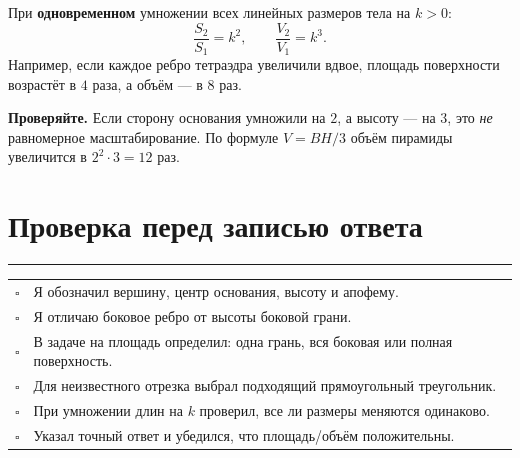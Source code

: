 \documentclass[a4paper,12pt]{article}
\newcommand{\sect}[1]{\section{#1}\vspace{-1.5mm}\noindent\color{accent}\rule{\linewidth}{0.45pt}\color{textgray}\vspace{2mm}}
\newcommand{\warning}[1]{\par\textcolor{darkaccent}{\textbf{Проверяйте.}} #1\par}
\newcommand{\cb}{\(\square\)}
\begin{document}
При \textbf{одновременном} умножении всех линейных размеров тела на \(k>0\):
\[
\boxed{\frac{S_2}{S_1}=k^2},\qquad
\boxed{\frac{V_2}{V_1}=k^3}.
\]
Например, если каждое ребро тетраэдра увеличили вдвое, площадь поверхности возрастёт в \(4\) раза, а объём --- в \(8\) раз.

\warning{Если сторону основания умножили на \(2\), а высоту --- на \(3\), это \emph{не} равномерное масштабирование. По формуле \(V=BH/3\) объём пирамиды увеличится в \(2^2\cdot3=12\) раз.}

\sect{Проверка перед записью ответа}
\begin{tabularx}{\linewidth}{@{}p{9mm}X@{}}
\cb& Я обозначил вершину, центр основания, высоту и апофему.\\[2pt]
\cb& Я отличаю боковое ребро от высоты боковой грани.\\[2pt]
\cb& В задаче на площадь определил: одна грань, вся боковая или полная поверхность.\\[2pt]
\cb& Для неизвестного отрезка выбрал подходящий прямоугольный треугольник.\\[2pt]
\cb& При умножении длин на \(k\) проверил, все ли размеры меняются одинаково.\\[2pt]
\cb& Указал точный ответ и убедился, что площадь/объём положительны.\\
\end{tabularx}
\end{document}
